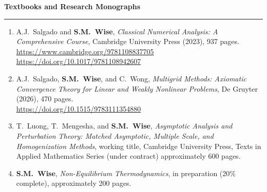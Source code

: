 \documentclass[10pt,letterpaper]{article}
\newcommand{\cvsection}[1]{%
  \Needspace{5\baselineskip}\par\vspace{13pt}%
  {\color{Smokey}\fontsize{15}{17}\selectfont\bfseries #1}\par\vspace{3pt}%
  {\color{UTOrange}\rule{\linewidth}{1.8pt}}\par\vspace{4pt}%
}
\begin{document}
\cvsection{Textbooks and Research Monographs}
    \begin{enumerate}
    \item
A.J.~Salgado and \textbf{S.M.~Wise}, {\sl Classical Numerical Analysis: A Comprehensive Course}, Cambridge University Press (2023), 937 pages.
	\\
\url{https://www.cambridge.org/9781108837705}
	\\
\url{https://doi.org/10.1017/9781108942607}
    \item
A.J.~Salgado, \textbf{S.M.~Wise}, and C.~Wong, {\sl Multigrid Methods: Axiomatic Convergence Theory for Linear and Weakly Nonlinear Problems}, De Gruyter (2026), 470 pages.
	\\
\url{https://doi.org/10.1515/9783111354880}

	\item
T.~Luong, T.~Mengesha, and \textbf{S.M.~Wise}, {\sl Asymptotic Analysis and Perturbation Theory: Matched Asymptotic, Multiple Scale, and Homogenization Methods}, working title, Cambridge University Press, Texts in Applied Mathematics Series (under contract) approximately 600 pages.

    \item
\textbf{S.M.~Wise}, {\sl Non-Equilibrium Thermodynamics}, in preparation (20\% complete), approximately 200 pages.
    \end{enumerate}
\end{document}
